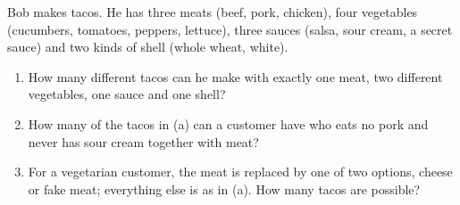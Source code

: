 Bob makes tacos. He has three meats (beef, pork, chicken), four vegetables (cucumbers, tomatoes, peppers, lettuce), three sauces (salsa, sour cream, a secret sauce) and two kinds of shell (whole wheat, white).
\begin{enumerate}
\item[(a)] How many different tacos can he make with exactly one meat, two different vegetables, one sauce and one shell?
\item[(b)] How many of the tacos in (a) can a customer have who eats no pork and never has sour cream together with meat?
\item[(c)] For a vegetarian customer, the meat is replaced by one of two options, cheese or fake meat; everything else is as in (a). How many tacos are possible?
\end{enumerate}
